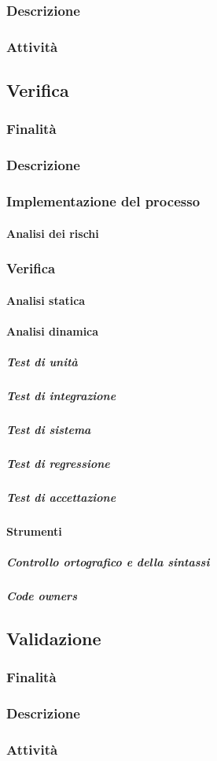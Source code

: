 \documentclass[../norme-di-progetto.tex]{subfiles}
\begin{document}
\subsubsection{Descrizione}
\subsubsection{Attività}
\subsection{Verifica}
\subsubsection{Finalità}
\subsubsection{Descrizione}
\subsubsection{Implementazione del processo}
\paragraph{Analisi dei rischi}
\subsubsection{Verifica}
\paragraph{Analisi statica}
\paragraph{Analisi dinamica}
\subparagraph{Test di unità}
\subparagraph{Test di integrazione}
\subparagraph{Test di sistema}
\subparagraph{Test di regressione}
\subparagraph{Test di accettazione}
\paragraph{Strumenti}
\subparagraph{Controllo ortografico e della sintassi}
\subparagraph{Code owners}
\subsection{Validazione}
\subsubsection{Finalità}
\subsubsection{Descrizione}
\subsubsection{Attività}
\end{document}
